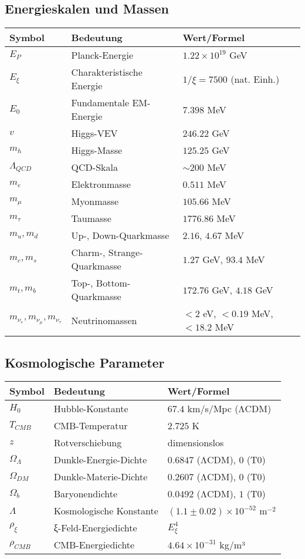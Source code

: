 \documentclass[12pt,a4paper]{article}
\theoremstyle{definition}
\begin{document}
\subsection{Energieskalen und Massen}
\begin{longtable}{lll}
	\toprule
	\textbf{Symbol} & \textbf{Bedeutung} & \textbf{Wert/Formel} \\
	\midrule
	$E_P$ & Planck-Energie & $1.22 \times 10^{19}$ GeV \\
	$E_\xi$ & Charakteristische Energie & $1/\xi = 7500$ (nat. Einh.) \\
	$E_0$ & Fundamentale EM-Energie & $7.398$ MeV \\
	$v$ & Higgs-VEV & $246.22$ GeV \\
	$m_h$ & Higgs-Masse & $125.25$ GeV \\
	$\Lambda_{QCD}$ & QCD-Skala & $\sim 200$ MeV \\
	$m_e$ & Elektronmasse & $0.511$ MeV \\
	$m_\mu$ & Myonmasse & $105.66$ MeV \\
	$m_\tau$ & Taumasse & $1776.86$ MeV \\
	$m_u, m_d$ & Up-, Down-Quarkmasse & $2.16$, $4.67$ MeV \\
	$m_c, m_s$ & Charm-, Strange-Quarkmasse & $1.27$ GeV, $93.4$ MeV \\
	$m_t, m_b$ & Top-, Bottom-Quarkmasse & $172.76$ GeV, $4.18$ GeV \\
	$m_{\nu_e}, m_{\nu_\mu}, m_{\nu_\tau}$ & Neutrinomassen & $< 2$ eV, $< 0.19$ MeV, $< 18.2$ MeV \\
	\bottomrule
\end{longtable}

\subsection{Kosmologische Parameter}
\begin{longtable}{lll}
	\toprule
	\textbf{Symbol} & \textbf{Bedeutung} & \textbf{Wert/Formel} \\
	\midrule
	$H_0$ & Hubble-Konstante & $67.4$ km/s/Mpc (ΛCDM) \\
	$T_{CMB}$ & CMB-Temperatur & $2.725$ K \\
	$z$ & Rotverschiebung & dimensionslos \\
	$\Omega_\Lambda$ & Dunkle-Energie-Dichte & $0.6847$ (ΛCDM), $0$ (T0) \\
	$\Omega_{DM}$ & Dunkle-Materie-Dichte & $0.2607$ (ΛCDM), $0$ (T0) \\
	$\Omega_b$ & Baryonendichte & $0.0492$ (ΛCDM), $1$ (T0) \\
	$\Lambda$ & Kosmologische Konstante & $(1.1 \pm 0.02) \times 10^{-52}$ m$^{-2}$ \\
	$\rho_\xi$ & ξ-Feld-Energiedichte & $E_\xi^4$ \\
	$\rho_{CMB}$ & CMB-Energiedichte & $4.64 \times 10^{-31}$ kg/m³ \\
	\bottomrule
\end{longtable}
\end{document}
